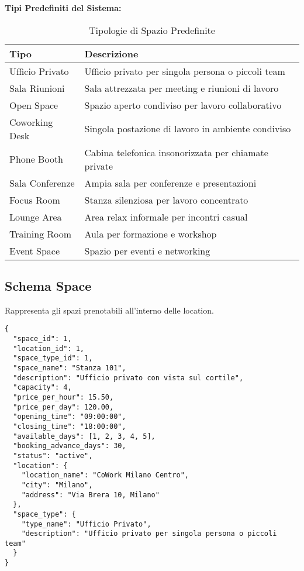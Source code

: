\textbf{Tipi Predefiniti del Sistema:}
\begin{table}[H]
\centering
\scriptsize
\begin{tabular}{@{}lp{10cm}@{}}
\toprule
\textbf{Tipo} & \textbf{Descrizione} \\
\midrule
Ufficio Privato & Ufficio privato per singola persona o piccoli team \\
Sala Riunioni & Sala attrezzata per meeting e riunioni di lavoro \\
Open Space & Spazio aperto condiviso per lavoro collaborativo \\
Coworking Desk & Singola postazione di lavoro in ambiente condiviso \\
Phone Booth & Cabina telefonica insonorizzata per chiamate private \\
Sala Conferenze & Ampia sala per conferenze e presentazioni \\
Focus Room & Stanza silenziosa per lavoro concentrato \\
Lounge Area & Area relax informale per incontri casual \\
Training Room & Aula per formazione e workshop \\
Event Space & Spazio per eventi e networking \\
\bottomrule
\end{tabular}
\caption{Tipologie di Spazio Predefinite}
\end{table}

\subsection{Schema Space}
Rappresenta gli spazi prenotabili all'interno delle location.

\begin{lstlisting}[caption=Schema Space Completo]
{
  "space_id": 1,
  "location_id": 1,
  "space_type_id": 1,
  "space_name": "Stanza 101",
  "description": "Ufficio privato con vista sul cortile",
  "capacity": 4,
  "price_per_hour": 15.50,
  "price_per_day": 120.00,
  "opening_time": "09:00:00",
  "closing_time": "18:00:00",
  "available_days": [1, 2, 3, 4, 5],
  "booking_advance_days": 30,
  "status": "active",
  "location": {
    "location_name": "CoWork Milano Centro",
    "city": "Milano",
    "address": "Via Brera 10, Milano"
  },
  "space_type": {
    "type_name": "Ufficio Privato",
    "description": "Ufficio privato per singola persona o piccoli team"
  }
}
\end{lstlisting}

